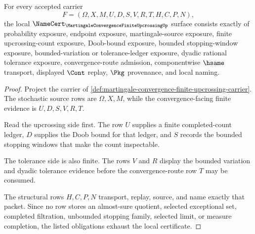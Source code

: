 \begin{theorem}
\label{thm:martingale-convergence-finite-upcrossing-namecert-obligations}
For every accepted carrier
$$
F=(\Omega,X,M,U,D,S,V,R,T,H,C,P,N),
$$
the local $\NameCert_{\MartingaleConvergenceFiniteUpcrossingUp}$ surface
consists exactly of probability exposure, endpoint exposure, martingale-source
exposure, finite upcrossing-count exposure, Doob-bound exposure, bounded
stopping-window exposure, bounded-variation or tolerance-ledger exposure,
dyadic rational tolerance exposure, convergence-route admission, componentwise
$\hsame$ transport, displayed $\Cont$ replay, $\Pkg$ provenance, and local
naming.
\end{theorem}
\begin{proof}
Project the carrier of
\autoref{def:martingale-convergence-finite-upcrossing-carrier}. The stochastic
source rows are $\Omega,X,M$, while the convergence-facing finite evidence is
$U,D,S,V,R,T$.

Read the upcrossing side first. The row $U$ supplies a finite completed-count
ledger, $D$ supplies the Doob bound for that ledger, and $S$ records the bounded
stopping windows that make the count inspectable.

The tolerance side is also finite. The rows $V$ and $R$ display the bounded
variation and dyadic tolerance evidence before the convergence-route row $T$
may be consumed.

The structural rows $H,C,P,N$ transport, replay, source, and name exactly that
packet. Since no row stores an almost-sure quotient, selected exceptional set,
completed filtration, unbounded stopping family, selected limit, or measure
completion, the listed obligations exhaust the local certificate.
\end{proof}

